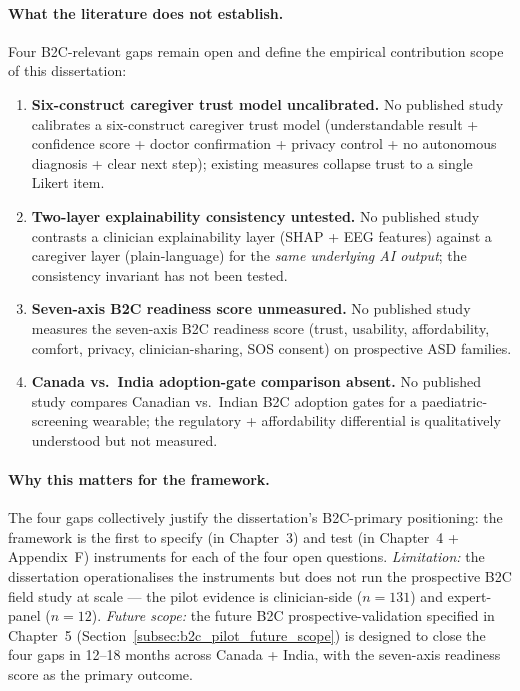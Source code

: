 \paragraph{What the literature does not establish.}
Four B2C-relevant gaps remain open and define the empirical contribution scope of this dissertation:

\begin{enumerate}[leftmargin=*, itemsep=2pt, label=(\roman*)]
\item \textbf{Six-construct caregiver trust model uncalibrated.} No published study calibrates a six-construct caregiver trust model (understandable result + confidence score + doctor confirmation + privacy control + no autonomous diagnosis + clear next step); existing measures collapse trust to a single Likert item.
\item \textbf{Two-layer explainability consistency untested.} No published study contrasts a clinician explainability layer (SHAP + EEG features) against a caregiver layer (plain-language) for the \emph{same underlying AI output}; the consistency invariant has not been tested.
\item \textbf{Seven-axis B2C readiness score unmeasured.} No published study measures the seven-axis B2C readiness score (trust, usability, affordability, comfort, privacy, clinician-sharing, SOS consent) on prospective ASD families.
\item \textbf{Canada vs.\ India adoption-gate comparison absent.} No published study compares Canadian vs.\ Indian B2C adoption gates for a paediatric-screening wearable; the regulatory + affordability differential is qualitatively understood but not measured.
\end{enumerate}

\paragraph{Why this matters for the framework.}
The four gaps collectively justify the dissertation's B2C-primary positioning: the framework is the first to specify (in Chapter~3) and test (in Chapter~4 + Appendix~F) instruments for each of the four open questions. \emph{Limitation:} the dissertation operationalises the instruments but does not run the prospective B2C field study at scale --- the pilot evidence is clinician-side ($n = 131$) and expert-panel ($n = 12$). \emph{Future scope:} the future B2C prospective-validation specified in Chapter~5 (Section~\ref{subsec:b2c_pilot_future_scope}) is designed to close the four gaps in 12--18 months across Canada + India, with the seven-axis readiness score as the primary outcome.

